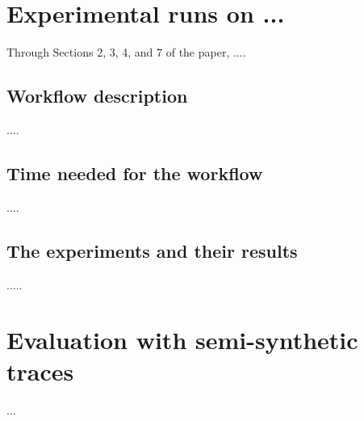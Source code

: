 \documentclass[sigconf,nonacm=true]{acmart}
\begin{document}
\section{Experimental runs on ...}
\label{sec:exp}
Through Sections 2, 3, 4, and 7 of the paper, 
....

\subsection{Workflow description}
....

\subsection{Time needed for the workflow}
....

\subsection{The experiments and their results}
.....


\section{Evaluation with semi-synthetic traces}
\label{sec:tra}
...
\end{document}
